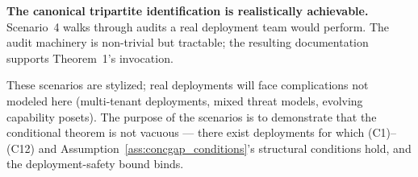\textbf{The canonical tripartite identification is realistically
achievable.}  Scenario~4 walks through audits a real deployment
team would perform. The audit machinery is non-trivial but
tractable; the resulting documentation supports Theorem~1's
invocation.

These scenarios are stylized; real deployments will face
complications not modeled here (multi-tenant deployments, mixed
threat models, evolving capability posets). The purpose of the
scenarios is to demonstrate that the conditional theorem is not
vacuous --- there exist deployments for which (C1)--(C12) and
Assumption~\ref{ass:concgap_conditions}'s structural conditions hold, and the
deployment-safety bound binds.
